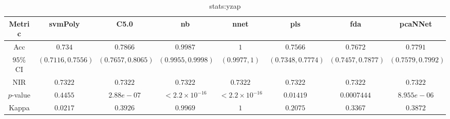 \begin{table}[!ht]
	\centering
	\begin{tabular}{|c|c|c|c|c|c|c|c|}
		\hline
		Metric & svmPoly & C5.0 & nb & nnet & pls & fda & pcaNNet \\ \hline
		Acc & $0.734$ & $0.7866$ & $0.9987$ & $1$ & $0.7566$ & $0.7672$ & $0.7791$ \\ \hline
		$95\%$ CI & $(0.7116, 0.7556)$ & $(0.7657, 0.8065)$ & $(0.9955, 0.9998)$ & $(0.9977, 1)$ & $(0.7348, 0.7774)$ & $(0.7457, 0.7877)$ & $(0.7579, 0.7992)$ \\ \hline
		NIR & $0.7322$ & $0.7322$ & $0.7322$ & $0.7322$ & $0.7322$ & $0.7322$ & $0.7322$ \\ \hline
		$p$-value & $0.4455$ & $2.88e-07$ & $< 2.2 \times {10}^{-16}$ & $< 2.2 \times {10}^{-16}$ & $0.01419$ & $0.0007444$ & $8.955e-06$ \\ \hline
		Kappa & $0.0217$ & $0.3926$ & $0.9969$ & $1$ & $0.2075$ & $0.3367$ & $0.3872$ \\ \hline
	\end{tabular}
	\caption{stats:yzap}
	\label{tab:stats:yzap}
\end{table}
